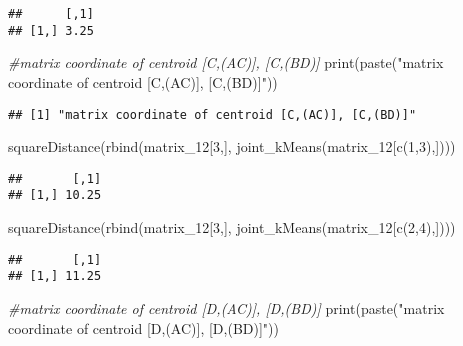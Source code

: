 \documentclass[
]{article}
\newenvironment{Shaded}{\begin{snugshade}}{\end{snugshade}}
\newcommand{\CommentTok}[1]{\textcolor[rgb]{0.56,0.35,0.01}{\textit{#1}}}
\newcommand{\DecValTok}[1]{\textcolor[rgb]{0.00,0.00,0.81}{#1}}
\newcommand{\FunctionTok}[1]{\textcolor[rgb]{0.00,0.00,0.00}{#1}}
\newcommand{\NormalTok}[1]{#1}
\newcommand{\StringTok}[1]{\textcolor[rgb]{0.31,0.60,0.02}{#1}}
\begin{document}
\begin{verbatim}
##      [,1]
## [1,] 3.25
\end{verbatim}

\begin{Shaded}
\begin{Highlighting}[]
\CommentTok{\#matrix coordinate of centroid [C,(AC)], [C,(BD)]}
\FunctionTok{print}\NormalTok{(}\FunctionTok{paste}\NormalTok{(}\StringTok{"matrix coordinate of centroid [C,(AC)], [C,(BD)]"}\NormalTok{))}
\end{Highlighting}
\end{Shaded}

\begin{verbatim}
## [1] "matrix coordinate of centroid [C,(AC)], [C,(BD)]"
\end{verbatim}

\begin{Shaded}
\begin{Highlighting}[]
\FunctionTok{squareDistance}\NormalTok{(}\FunctionTok{rbind}\NormalTok{(matrix\_12[}\DecValTok{3}\NormalTok{,],}
                     \FunctionTok{joint\_kMeans}\NormalTok{(matrix\_12[}\FunctionTok{c}\NormalTok{(}\DecValTok{1}\NormalTok{,}\DecValTok{3}\NormalTok{),])))}
\end{Highlighting}
\end{Shaded}

\begin{verbatim}
##       [,1]
## [1,] 10.25
\end{verbatim}

\begin{Shaded}
\begin{Highlighting}[]
\FunctionTok{squareDistance}\NormalTok{(}\FunctionTok{rbind}\NormalTok{(matrix\_12[}\DecValTok{3}\NormalTok{,],}
                     \FunctionTok{joint\_kMeans}\NormalTok{(matrix\_12[}\FunctionTok{c}\NormalTok{(}\DecValTok{2}\NormalTok{,}\DecValTok{4}\NormalTok{),])))}
\end{Highlighting}
\end{Shaded}

\begin{verbatim}
##       [,1]
## [1,] 11.25
\end{verbatim}

\begin{Shaded}
\begin{Highlighting}[]
\CommentTok{\#matrix coordinate of centroid [D,(AC)], [D,(BD)]}
\FunctionTok{print}\NormalTok{(}\FunctionTok{paste}\NormalTok{(}\StringTok{"matrix coordinate of centroid [D,(AC)], [D,(BD)]"}\NormalTok{))}
\end{Highlighting}
\end{Shaded}
\end{document}
